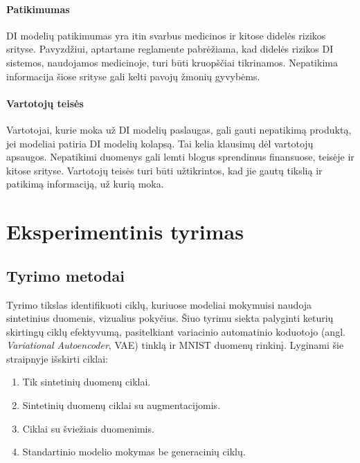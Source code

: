 \documentclass{VUMIFInfKursinis}
\begin{document}
\paragraph{Patikimumas} 
DI modelių patikimumas yra itin svarbus medicinos ir kitose didelės rizikos srityse. Pavyzdžiui, aptartame reglamente \cite{AIEuropeanAct} pabrėžiama, kad didelės rizikos DI sistemos, naudojamos medicinoje, turi būti kruopščiai tikrinamos. Nepatikima informacija šiose srityse gali kelti pavojų žmonių gyvybėms. 

\paragraph{Vartotojų teisės} 
Vartotojai, kurie moka už DI modelių paslaugas, gali gauti nepatikimą produktą, jei modeliai patiria DI modelių kolapsą. Tai kelia klausimų dėl vartotojų apsaugos. Nepatikimi duomenys gali lemti blogus sprendimus finansuose, teisėje ir kitose srityse. Vartotojų teisės turi būti užtikrintos, kad jie gautų tikslią ir patikimą informaciją, už kurią moka.







\section{Eksperimentinis tyrimas}
\subsection{Tyrimo metodai}
Tyrimo tikslas identifikuoti ciklų, kuriuose modeliai mokymuisi naudoja sintetinius duomenis, vizualius pokyčius. Šiuo tyrimu siekta palyginti keturių skirtingų ciklų efektyvumą, pasitelkiant variacinio automatinio koduotojo (angl. \textsl{Variational Autoencoder}, VAE) tinklą ir MNIST \cite{MNIST} duomenų rinkinį. Lyginami šie straipnyje \cite{ModelsGoMAD} išskirti ciklai:
\begin{enumerate}
    \item Tik sintetinių duomenų ciklai.
    \item Sintetinių duomenų ciklai su augmentacijomis.
    \item Ciklai su šviežiais duomenimis.
    \item Standartinio modelio mokymas be generacinių ciklų.
\end{enumerate}
\end{document}
